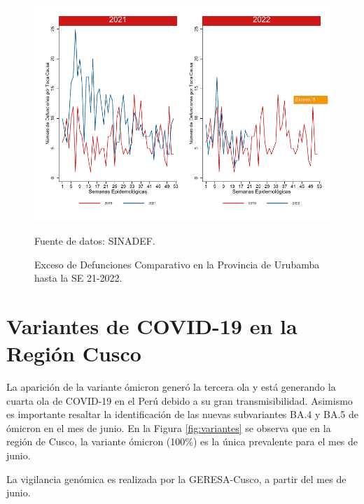 \documentclass[12pt,a4paper,openany]{book}
\begin{document}
	\begin{figure}[h]
		\caption{Exceso de Defunciones Comparativo en la Provincia de Urubamba hasta la SE 21-2022.}\label{fig:exceso_urub}
		\begin{center}
			\includegraphics[width=0.7\linewidth]{../figuras/exceso_13.pdf}
		\end{center}
		{\footnotesize {Fuente de datos: SINADEF.}}
	\end{figure}
	
	\clearpage
	
	\clearpage
	
	\section* {Variantes de COVID-19 en la Región Cusco}
	\noindent La aparición de la variante ómicron generó la tercera ola y está generando la cuarta ola de COVID-19 en el Perú debido a su gran transmisibilidad. Asimismo es importante resaltar la identificación de las nuevas subvariantes BA.4 y BA.5 de ómicron en el mes de junio. En la Figura \ref{fig:variantes} se observa que en la región de Cusco, la variante ómicron (100$\%$) es la única prevalente para el mes de junio.
	 
	La vigilancia genómica es realizada por la GERESA-Cusco, a partir del mes de junio.
	
\end{document}
